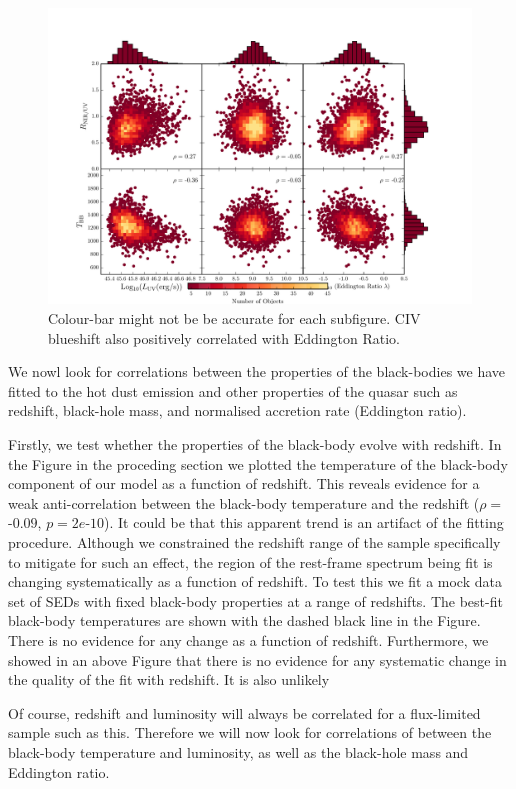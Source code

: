 \begin{figure}
  \includegraphics[width=\columnwidth]{figures/chapter06/correlations.pdf}
   \caption{Colour-bar might not be be accurate for each subfigure. CIV blueshift also positively correlated with Eddington Ratio.}
\end{figure}

We nowl look for correlations between the properties of the black-bodies we have fitted to the hot dust emission and other properties of the quasar such as redshift, black-hole mass, and normalised accretion rate (Eddington ratio). 

Firstly, we test whether the properties of the black-body evolve with redshift. In the Figure in the proceding section we plotted the temperature of the black-body component of our model as a function of redshift. This reveals evidence for a weak anti-correlation between the black-body temperature and the redshift ($\rho =$ -$0.09$, $p = 2e$-$10$). It could be that this apparent trend is an artifact of the fitting procedure. Although we constrained the redshift range of the sample specifically to mitigate for such an effect, the region of the rest-frame spectrum being fit is changing systematically as a function of redshift. To test this we fit a mock data set of SEDs with fixed black-body properties at a range of redshifts. The best-fit black-body temperatures are shown with the dashed black line in the Figure. There is no evidence for any change as a function of redshift. Furthermore, we showed in an above Figure that there is no evidence for any systematic change in the quality of the fit with redshift. It is also unlikely 

Of course, redshift and luminosity will always be correlated for a flux-limited sample such as this. Therefore we will now look for correlations of between the black-body temperature and luminosity, as well as the black-hole mass and Eddington ratio.


